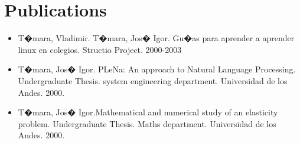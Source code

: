 \documentclass{article}
\begin{document}
\section{Publications}
\begin{itemize}
\item T�mara, Vladimir. T�mara, Jos� Igor. Gu�as para aprender a
  aprender linux en colegios. Structio Project. 2000-2003
\item T�mara, Jos� Igor. PLeNa: An approach to Natural Language
  Processing. Undergraduate Thesis. system engineering department. Universidad de los Andes. 2000.
\item T�mara, Jos� Igor.Mathematical and numerical study of an
  elasticity problem. Undergraduate Thesis. Maths department. Universidad de los Andes. 2000. 
\end{itemize}
\end{document}
